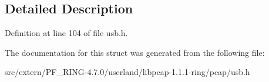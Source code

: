 \subsection{Detailed Description}


Definition at line 104 of file usb.h.



The documentation for this struct was generated from the following file:\begin{DoxyCompactItemize}
\item 
src/extern/PF\_\-RING-\/4.7.0/userland/libpcap-\/1.1.1-\/ring/pcap/usb.h\end{DoxyCompactItemize}
